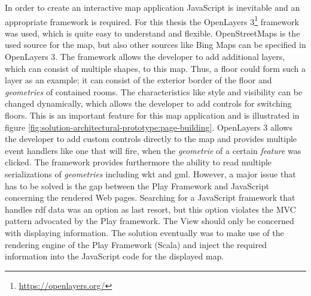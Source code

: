 \documentclass[draft,final]{vutinfth} %
\begin{document}
In order to create an interactive map application JavaScript is inevitable and an appropriate framework is required. For this thesis the OpenLayers 3\footnote{\url{https://openlayers.org/}} framework was used, which is quite easy to understand and flexible. OpenStreetMaps is the used source for the map, but also other sources like Bing Maps can be specified in OpenLayers 3. The framework allows the developer to add additional layers, which can consist of multiple shapes, to this map. Thus, a floor could form such a layer as an example; it can consist of the exterior border of the floor and \textit{geometries} of contained rooms. The characteristics like style and visibility can be changed dynamically, which allows the developer to add controls for switching floors. This is an important feature for this map application and is illustrated in figure \ref{fig:solution-architectural-prototype:page-building}. OpenLayers 3 allows the developer to add custom controls directly to the map and provides multiple event handlers like one that will fire, when the \textit{geometrie} of a certain \textit{feature} was clicked. The framework provides furthermore the ability to read multiple serializations of \textit{geometries} including \gls{wkt} and \gls{gml}. However, a major issue that has to be solved is the gap between the Play Framework and JavaScript concerning the rendered Web pages. Searching for a JavaScript framework that handles \gls{rdf} data was an option as last resort, but this option violates the MVC pattern advocated by the Play framework. The View should only be concerned with displaying information. The solution eventually was to make use of the rendering engine of the Play Framework (Scala) and inject the required information into the JavaScript code for the displayed map.
\end{document}
